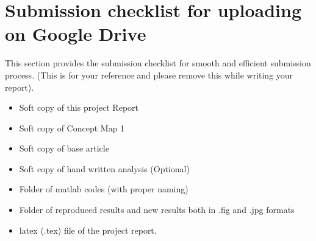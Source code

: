 \documentclass{article}
\begin{document}
\section*{Submission checklist for uploading on Google Drive}
This section provides the submission checklist for smooth and efficient submission process.  (This is for your reference and please remove this while writing your report).  
\begin{itemize}

\item Soft copy of this project Report
\item Soft copy of Concept Map 1
\item Soft copy of base article
\item Soft copy of hand written analysis (Optional)
\item Folder of matlab codes (with proper naming)
\item Folder of reproduced results and new results both in .fig and .jpg formats
\item latex (.tex) file of the project report.
\end{itemize}






\end{document}
